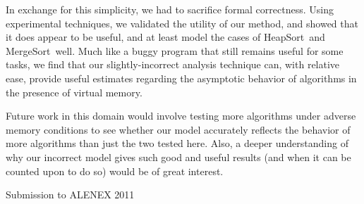 \documentclass{acmtrans2m}
\newcommand{\heapsort}{{\sc HeapSort}}
\newcommand{\mergesort}{{\sc MergeSort}}
\begin{document}
In exchange for this simplicity, we had to sacrifice formal correctness.  Using
experimental techniques, we validated the utility of our method, and showed
that it does appear to be useful, and at least model the cases of \heapsort\
and \mergesort\ well.  Much like a buggy program that still remains useful for
some tasks, we find that our slightly-incorrect analysis technique can, with
relative ease, provide useful estimates regarding the asymptotic behavior of
algorithms in the presence of virtual memory.

Future work in this domain would involve testing more algorithms under adverse
memory conditions to see whether our model accurately reflects the behavior of
more algorithms than just the two tested here.  Also, a deeper understanding of
why our incorrect model gives such good and useful results (and when it can be
counted upon to do so) would be of great interest.




\begin{received} 
Submission to ALENEX 2011
\end{received}
\end{document}
